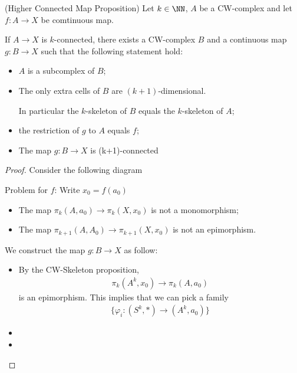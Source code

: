 \documentclass[Total.tex]{subfiles}
\begin{document}
	\begin{proposition}
		(Higher Connected Map Proposition) Let $k\in \NN$, $A$ be a CW-complex and let $f:A\rightarrow X$ be comtinuous map.
		
		If $A\rightarrow X$ is $k$-connected, there exists a CW-complex $B$ and a continuous map $g:B\rightarrow X$ such that the following statement hold:
		\begin{itemize}
			\item $A$ is a subcomplex of $B$;
			\item The only extra cells of $B$ are $(k+1)$-dimensional.
			
			In particular the $k$-skeleton of $B$ equals the $k$-skeleton of $A$;
			\item the restriction of $g$ to $A$ equals $f$;
			\item The map $g:B\rightarrow X$ is (k+1)-connected
		\end{itemize}
	\end{proposition}
	\begin{proof}
		Consider the following diagram
		\begin{center}
		\end{center}
		Problem for $f$: Write $x_0=f(a_0)$
		\begin{itemize}
			\item The map $\pi_k(A,a_0)\rightarrow \pi_k(X,x_0)$ is not a monomorphism;
			\item The map $\pi_{k+1}(A,A_0)\rightarrow \pi_{k+1}(X,x_0)$ is not an epimorphism.
		\end{itemize}
		We construct the map $g:B\rightarrow X$ as follow:
		\begin{itemize}
			\item By the CW-Skeleton proposition,
			\begin{gather*}
				\pi_k(A^k,x_0)\rightarrow \pi_k(A,a_0)
			\end{gather*}
			is an epimorphism. This implies that we can pick a family
			\begin{gather*}
				\{\varphi_i:(S^k,*)\rightarrow (A^k,a_0)\}
			\end{gather*}
			\item 
			\item 
		\end{itemize}
	\end{proof}
\end{document}
